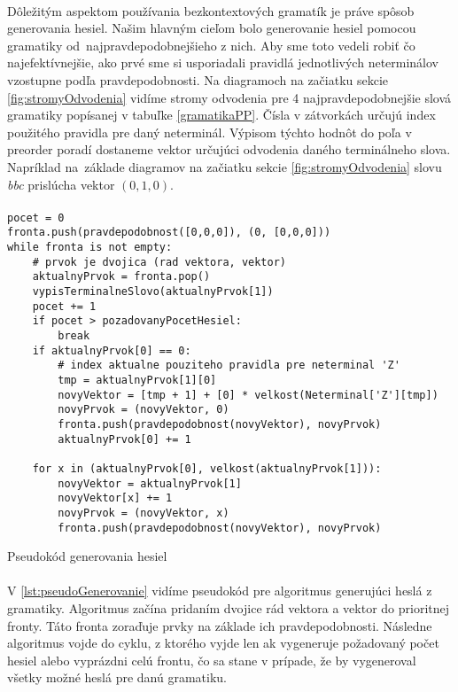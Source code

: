 \paragraph{}
Dôležitým aspektom používania bezkontextových gramatík je práve spôsob generovania hesiel. Našim hlavným cieľom bolo generovanie hesiel pomocou gramatiky od~najpravdepodobnejšieho z nich. Aby sme toto vedeli robiť čo najefektívnejšie, ako prvé sme si usporiadali pravidlá jednotlivých neterminálov vzostupne podľa pravdepodobnosti. Na diagramoch na začiatku sekcie \ref{fig:stromyOdvodenia} vidíme stromy odvodenia pre 4 najpravdepodobnejšie slová gramatiky popísanej v tabuľke \ref{gramatikaPP}. Čísla v zátvorkách určujú index použitého pravidla pre daný neterminál. Výpisom týchto hodnôt do poľa v preorder poradí dostaneme vektor určujúci odvodenia daného terminálneho slova. Napríklad na~základe diagramov na začiatku sekcie \ref{fig:stromyOdvodenia} slovu \emph{bbc} prislúcha vektor \((0,1,0)\).

\paragraph{}
\begin{listing}
\begin{verbatim}
pocet = 0
fronta.push(pravdepodobnost([0,0,0]), (0, [0,0,0]))
while fronta is not empty:
	# prvok je dvojica (rad vektora, vektor)
	aktualnyPrvok = fronta.pop()
	vypisTerminalneSlovo(aktualnyPrvok[1])
	pocet += 1
	if pocet > pozadovanyPocetHesiel:
		break
	if aktualnyPrvok[0] == 0:
		# index aktualne pouziteho pravidla pre neterminal 'Z'
		tmp = aktualnyPrvok[1][0]
		novyVektor = [tmp + 1] + [0] * velkost(Neterminal['Z'][tmp])
		novyPrvok = (novyVektor, 0)
		fronta.push(pravdepodobnost(novyVektor), novyPrvok)
		aktualnyPrvok[0] += 1

	for x in (aktualnyPrvok[0], velkost(aktualnyPrvok[1])):
		novyVektor = aktualnyPrvok[1]
		novyVektor[x] += 1
		novyPrvok = (novyVektor, x)
		fronta.push(pravdepodobnost(novyVektor), novyPrvok)
\end{verbatim}
\caption{Pseudokód generovania hesiel}
\label{lst:pseudoGenerovanie}
\end{listing}

\paragraph{}
V \ref{lst:pseudoGenerovanie} vidíme pseudokód pre algoritmus generujúci heslá z gramatiky. Algoritmus začína pridaním dvojice rád vektora a vektor do prioritnej fronty. Táto fronta zoraďuje prvky na základe ich pravdepodobnosti. Následne algoritmus vojde do cyklu, z ktorého vyjde len ak vygeneruje požadovaný počet hesiel alebo vyprázdni celú frontu, čo sa stane v prípade, že by vygeneroval všetky možné heslá pre danú gramatiku.

